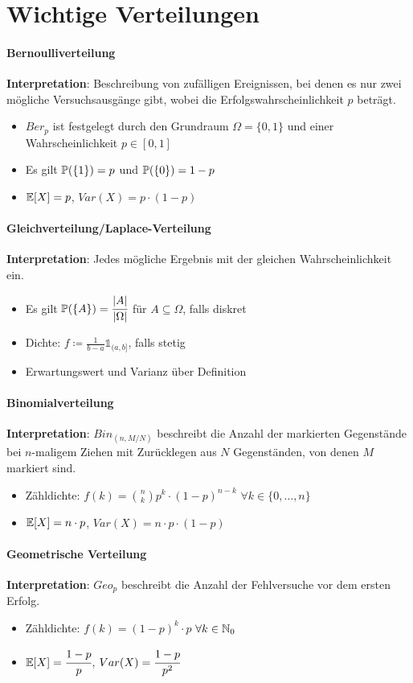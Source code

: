\section{Wichtige Verteilungen}
\paragraph{Bernoulliverteilung}
\textbf{Interpretation}: Beschreibung von zufälligen Ereignissen, bei denen es nur zwei mögliche Versuchsausgänge gibt, wobei die Erfolgswahrscheinlichkeit $p$ beträgt.
\begin{itemize}
	\item $Ber_p$ ist festgelegt durch den Grundraum $\Omega=\{0,1\}$ und einer Wahrscheinlichkeit $p\in[0,1]$
	\item Es gilt $\mathbb{P}(\{1\})=p$ und $\mathbb{P}(\{0\})=1-p$
	\item $\mathbb{E}[X]=p$, $Var(X)=p\cdot(1-p)$
\end{itemize}

\paragraph{Gleichverteilung/Laplace-Verteilung}
\textbf{Interpretation}: Jedes mögliche Ergebnis mit der gleichen Wahrscheinlichkeit ein.
\begin{itemize}
	\item Es gilt $\mathbb{P}(\{A\})=\cfrac{|A|}{|\Omega|}$ für $A\subseteq\Omega$, falls diskret
	\item Dichte: $f\coloneqq\frac{1}{b-a}\mathds{1}_{(a,b]}$, falls stetig
	\item Erwartungswert und Varianz über Definition
\end{itemize}

\paragraph{Binomialverteilung}
\textbf{Interpretation}: $Bin_{(n,M/N)}$ beschreibt die Anzahl der markierten Gegenstände bei $n$-maligem Ziehen mit Zurücklegen aus $N$ Gegenständen, von denen $M$ markiert sind.
\begin{itemize}
	\item Zähldichte: $f(k)=\binom{n}{k}p^k\cdot(1-p)^{n-k}$ \qquad$\forall k\in\{0,\ldots,n\}$
	\item $\mathbb{E}[X]=n\cdot p$, $Var(X)=n\cdot p\cdot(1-p)$
\end{itemize}

\paragraph{Geometrische Verteilung}
\textbf{Interpretation}: $Geo_p$ beschreibt die Anzahl der Fehlversuche vor dem ersten Erfolg.
\begin{itemize}
	\item Zähldichte: $f(k)=(1-p)^k\cdot p$ \qquad$\forall k\in\mathbb{N}_0$
	\item $\mathbb{E}[X]=\cfrac{1-p}{p}$, $Var(X)=\cfrac{1-p}{p^2}$
\end{itemize}


